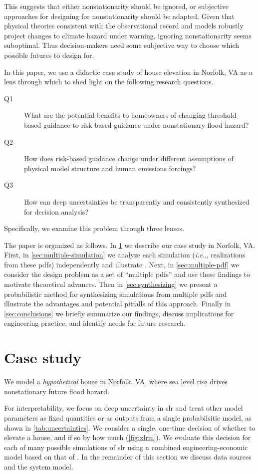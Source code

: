\documentclass[12pt]{article}
\makeatletter
\DeclareRobustCommand\onedot{\futurelet\@let@token\@onedot}
\def\@onedot{\ifx\@let@token.\else.\null\fi\xspace}
\def\ie{\emph{i.e}\onedot} \def\Ie{\emph{I.e}\onedot}
\DeclareRobustCommand\onedot{\futurelet\@let@token\@onedot}
\def\@onedot{\ifx\@let@token.\else.\null\fi\xspace}
\def\ie{\emph{i.e}\onedot} \def\Ie{\emph{I.e}\onedot}
\makeatother
\begin{document}
This suggests that either nonstationarity should be ignored, or subjective approaches for designing for nonstationarity should be adapted.
Given that physical theories consistent with the observational record and models robustly project changes to climate hazard under warning, ignoring nonstationarity seems suboptimal.
Thus decision-makers need some subjective way to choose which possible futures to design for.

In this paper, we use a didactic case study of house elevation in Norfolk, VA as a lens through which to shed light on the following research questions.
\begin{description}
    \item[Q1] What are the potential benefits to homeowners of changing threshold-based guidance to risk-based guidance under nonstationary flood hazard?
    \item[Q2] How does risk-based guidance change under different assumptions of physical model structure and human emissions forcings?
    \item[Q3] How can deep uncertainties be transparently and consistently synthesized for decision analysis?
\end{description}
Specifically, we examine this problem through three lenses.

The paper is organized as follows.
In \cref{sec:case-study} we describe our case study in Norfolk, VA.
First, in \cref{sec:multiple-simulation} we analyze each simulation (\ie, realizations from these \glspl{pdf}) independently and illustrate .
Next, in \cref{sec:multiple-pdf} we consider the design problem as a set of ``multiple \glspl{pdf}'' and use these findings to motivate theoretical advances.
Then in \cref{sec:synthesizing} we present a probabilistic method for synthesizing simulations from multiple \glspl{pdf} and illustrate the advantages and potential pitfalls of this approach.
Finally in \cref{sec:conclusions} we briefly summarize our findings, discuss implications for engineering practice, and identify needs for future research.

\section{Case study}\label{sec:case-study}

We model a \emph{hypothetical} house in Norfolk, VA, where sea level rise drives nonstationary future flood hazard.

For interpretability, we focus on deep uncertainty in \gls{slr} and treat other model parameters as fixed quantities or as outputs from a single probabilsitic model, as shown in \cref{tab:uncertainties}.
We consider a single, one-time decision of whether to elevate a house, and if so by how much (\cref{fig:xlrm}).
We evaluate this decision for each of many possible simulations of \gls{slr} using a combined engineering-economic model based on that of \citet{zarekarizi_suboptimal:2020}.
In the remainder of this section we discuss data sources and the system model.
\end{document}
